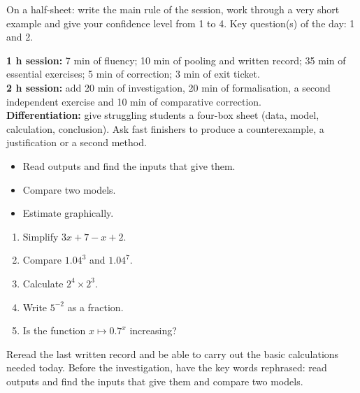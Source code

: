\begin{exitticket}[3 minutes]On a half-sheet: write the main rule of the session, work through a very short example and give your confidence level from 1 to 4. Key question(s) of the day: 1 and 2.\end{exitticket}

\ifmxteacher
\begin{method}
\textbf{1 h session:} 7 min of fluency; 10 min of pooling and written record; 35 min of essential exercises; 5 min of correction; 3 min of exit ticket.\\
\textbf{2 h session:} add 20 min of investigation, 20 min of formalisation, a second independent exercise and 10 min of comparative correction.\\
\textbf{Differentiation:} give struggling students a four-box sheet (data, model, calculation, conclusion). Ask fast finishers to produce a counterexample, a justification or a second method.
\end{method}
\fi
{}
\begin{objectives}\begin{itemize}\item Read outputs and find the inputs that give them.\item Compare two models.\item Estimate graphically.\end{itemize}\end{objectives}
\begin{fluency}\begin{enumerate}\item Simplify $3x+7-x+2$. \item Compare $\num{1,04}^3$ and $\num{1,04}^7$. \item Calculate $2^4\times2^3$. \item Write $5^{-2}$ as a fraction. \item Is the function $x\mapsto\num{0,7}^x$ increasing? \end{enumerate}\end{fluency}
\begin{prerequisites}Reread the last written record and be able to carry out the basic calculations needed today. Before the investigation, have the key words rephrased: read outputs and find the inputs that give them and compare two models.\end{prerequisites}

